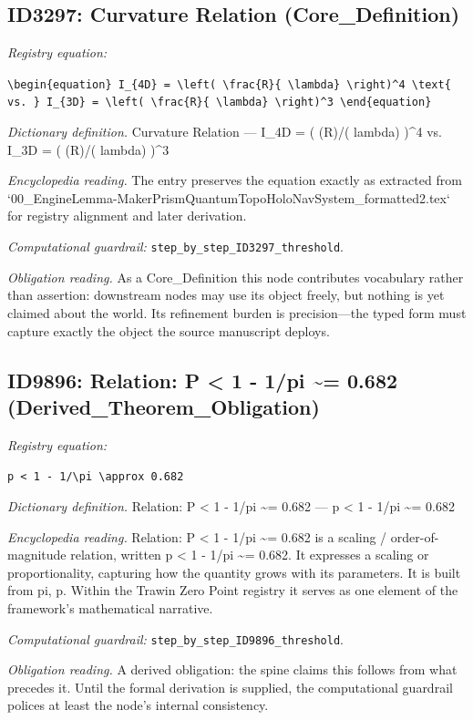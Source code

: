 \documentclass[11pt]{article}
\theoremstyle{remark}
\begin{document}
\subsection{ID3297: Curvature Relation (Core\_Definition)}

\noindent\textit{Registry equation:}\par
{\small\texttt{\textbackslash{}begin\{equation\} I\_\{4D\} = \textbackslash{}left( \textbackslash{}frac\{R\}\{ \textbackslash{}lambda\} \textbackslash{}right)\textasciicircum{}4 \textbackslash{}text\{ vs. \} I\_\{3D\} = \textbackslash{}left( \textbackslash{}frac\{R\}\{ \textbackslash{}lambda\} \textbackslash{}right)\textasciicircum{}3 \textbackslash{}end\{equation\}}}\par\medskip
\noindent\textit{Dictionary definition.} Curvature Relation --- I\_4D = ( (R)/( lambda) )\textasciicircum{}4 vs. I\_3D = ( (R)/( lambda) )\textasciicircum{}3\par\medskip
\noindent\textit{Encyclopedia reading.} The entry preserves the equation exactly as extracted from `00\_EngineLemma-MakerPrismQuantumTopoHoloNavSystem\_formatted2.tex` for registry alignment and later derivation.
\par\medskip\noindent\textit{Computational guardrail:} \texttt{step\_by\_step\_ID3297\_threshold}.
\par\medskip\noindent\textit{Obligation reading.} As a Core\_Definition this node contributes vocabulary rather than assertion: downstream nodes may use its object freely, but nothing is yet claimed about the world. Its refinement burden is precision---the typed form must capture exactly the object the source manuscript deploys.

\subsection{ID9896: Relation: P < 1 - 1/pi \textasciitilde{}= 0.682 (Derived\_Theorem\_Obligation)}

\noindent\textit{Registry equation:}\par
{\small\texttt{p < 1 - 1/\textbackslash{}pi \textbackslash{}approx 0.682}}\par\medskip
\noindent\textit{Dictionary definition.} Relation: P < 1 - 1/pi \textasciitilde{}= 0.682 --- p < 1 - 1/pi \textasciitilde{}= 0.682\par\medskip
\noindent\textit{Encyclopedia reading.} Relation: P < 1 - 1/pi \textasciitilde{}= 0.682 is a scaling / order-of-magnitude relation, written p < 1 - 1/pi \textasciitilde{}= 0.682. It expresses a scaling or proportionality, capturing how the quantity grows with its parameters. It is built from pi, p. Within the Trawin Zero Point registry it serves as one element of the framework's mathematical narrative.
\par\medskip\noindent\textit{Computational guardrail:} \texttt{step\_by\_step\_ID9896\_threshold}.
\par\medskip\noindent\textit{Obligation reading.} A derived obligation: the spine claims this follows from what precedes it. Until the formal derivation is supplied, the computational guardrail polices at least the node's internal consistency.
\end{document}
